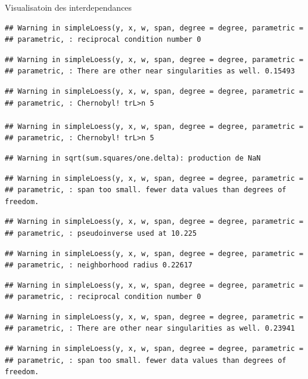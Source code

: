 \documentclass[11pt,ignorenonframetext,]{beamer}
\begin{document}
\begin{frame}[fragile]{Visualisatoin des interdependances}
\begin{verbatim}
## Warning in simpleLoess(y, x, w, span, degree = degree, parametric =
## parametric, : reciprocal condition number 0
\end{verbatim}

\begin{verbatim}
## Warning in simpleLoess(y, x, w, span, degree = degree, parametric =
## parametric, : There are other near singularities as well. 0.15493
\end{verbatim}

\begin{verbatim}
## Warning in simpleLoess(y, x, w, span, degree = degree, parametric =
## parametric, : Chernobyl! trL>n 5

## Warning in simpleLoess(y, x, w, span, degree = degree, parametric =
## parametric, : Chernobyl! trL>n 5
\end{verbatim}

\begin{verbatim}
## Warning in sqrt(sum.squares/one.delta): production de NaN
\end{verbatim}

\begin{verbatim}
## Warning in simpleLoess(y, x, w, span, degree = degree, parametric =
## parametric, : span too small. fewer data values than degrees of freedom.
\end{verbatim}

\begin{verbatim}
## Warning in simpleLoess(y, x, w, span, degree = degree, parametric =
## parametric, : pseudoinverse used at 10.225
\end{verbatim}

\begin{verbatim}
## Warning in simpleLoess(y, x, w, span, degree = degree, parametric =
## parametric, : neighborhood radius 0.22617
\end{verbatim}

\begin{verbatim}
## Warning in simpleLoess(y, x, w, span, degree = degree, parametric =
## parametric, : reciprocal condition number 0
\end{verbatim}

\begin{verbatim}
## Warning in simpleLoess(y, x, w, span, degree = degree, parametric =
## parametric, : There are other near singularities as well. 0.23941
\end{verbatim}

\begin{verbatim}
## Warning in simpleLoess(y, x, w, span, degree = degree, parametric =
## parametric, : span too small. fewer data values than degrees of freedom.
\end{verbatim}


\end{frame}
\end{document}
